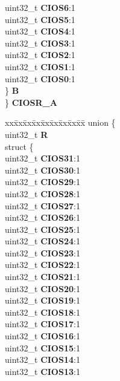 \begin{DoxyCompactItemize}
\begin{tabbing}
\>\>uint32\_t {\bfseries CIOS6}:1\\
\>\>uint32\_t {\bfseries CIOS5}:1\\
\>\>uint32\_t {\bfseries CIOS4}:1\\
\>\>uint32\_t {\bfseries CIOS3}:1\\
\>\>uint32\_t {\bfseries CIOS2}:1\\
\>\>uint32\_t {\bfseries CIOS1}:1\\
\>\>uint32\_t {\bfseries CIOS0}:1\\
\>\} {\bfseries B}\\
\} {\bfseries CIOSR\_A}\\

\end{tabbing}\item 
\mbox{\label{structETPU__tag_ac3cd9b68caad4237a401129bda5d065e}} 
\begin{tabbing}
xx\=xx\=xx\=xx\=xx\=xx\=xx\=xx\=xx\=\kill
union \{\\
\>uint32\_t {\bfseries R}\\
\>struct \{\\
\>\>uint32\_t {\bfseries CIOS31}:1\\
\>\>uint32\_t {\bfseries CIOS30}:1\\
\>\>uint32\_t {\bfseries CIOS29}:1\\
\>\>uint32\_t {\bfseries CIOS28}:1\\
\>\>uint32\_t {\bfseries CIOS27}:1\\
\>\>uint32\_t {\bfseries CIOS26}:1\\
\>\>uint32\_t {\bfseries CIOS25}:1\\
\>\>uint32\_t {\bfseries CIOS24}:1\\
\>\>uint32\_t {\bfseries CIOS23}:1\\
\>\>uint32\_t {\bfseries CIOS22}:1\\
\>\>uint32\_t {\bfseries CIOS21}:1\\
\>\>uint32\_t {\bfseries CIOS20}:1\\
\>\>uint32\_t {\bfseries CIOS19}:1\\
\>\>uint32\_t {\bfseries CIOS18}:1\\
\>\>uint32\_t {\bfseries CIOS17}:1\\
\>\>uint32\_t {\bfseries CIOS16}:1\\
\>\>uint32\_t {\bfseries CIOS15}:1\\
\>\>uint32\_t {\bfseries CIOS14}:1\\
\>\>uint32\_t {\bfseries CIOS13}:1\\

\end{tabbing}
\end{DoxyCompactItemize}

